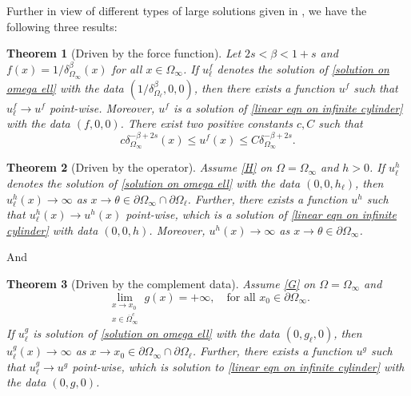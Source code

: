 \documentclass{amsart}
\newtheorem{theorem}{Theorem}[section]
\newcommand{\ul}{u_{\ell}}
\begin{document}
Further in view of different types of large solutions given in \cite{Abatangelo2015LargesHarmonic}, we have the following three results:

\begin{theorem}[Driven by the force function] 
Let $2s<\beta<1+s$ and $f(x)=1/\delta^{\beta}_{\Omega_{\infty}}(x)$ for all $x\in \Omega_{\infty}$. If $u_{\ell}^{f}$ denotes the solution of \eqref{solution on omega ell} with the data $(1/\delta_{\Omega_\ell}^{\beta},0,0)$, then there exists a function $u^{f}$ such that $\ul^{f}\to u^{f}$ point-wise. Moreover, $u^{f}$ is a solution of \eqref{linear eqn on infinite cylinder} with the data $(f,0,0)$. There exist two positive constants $c, C$ such that 
      \begin{equation*}
          c\delta_{\Omega_{\infty}}^{-\beta+2s}(x)\leq u^{f}(x)\leq C \delta_{\Omega_{\infty}}^{-\beta+2s}.
      \end{equation*}
\end{theorem}
\begin{theorem}[Driven by the operator]
Assume \ref{H} on $\Omega=\Omega_{\infty}$ and $h>0$.  If $u_{\ell}^{h}$ denotes the solution of \eqref{solution on omega ell} with the data $(0,0,h_{\ell})$, then $u_{\ell}^{h}(x)\to \infty$ as $x\to \theta \in \partial\Omega_{\infty}\cap \partial\Omega_{\ell}$. Further, there exists a function $u^{h}$ such that $u_{\ell}^{h}(x)\to u^{h}(x)$ point-wise, which is a solution of \eqref{linear eqn on infinite cylinder} with data $(0,0,h)$. Moreover, $u^{h}(x)\to \infty$ as $x\to \theta\in \partial\Omega_{\infty}$.
\end{theorem}
And
\begin{theorem}[Driven by the complement data] 
Assume \ref{G} on $\Omega=\Omega_{\infty}$ and 
      \begin{equation*}
          \lim_{\substack{x \to x_{0} \\ x\in\overline{\Omega}^{c}_{\infty}}} g(x)=+\infty, \quad \text{for all } x_{0} \in \partial\Omega_{\infty}.
      \end{equation*}
      If $u^{g}_{\ell}$ is solution of \eqref{solution on omega ell} with the data $(0,g_\ell,0)$, then $u_{\ell}^{g}(x)\to \infty$ as $x\to x_{0}\in \partial\Omega_{\infty}\cap \partial\Omega_{\ell}$. Further,  there exists a function $u^{g}$ such that $u_{\ell}^{g}\to u^{g}$ point-wise, which is solution to \eqref{linear eqn on infinite cylinder} with the data $(0,g,0)$.
\end{theorem}
\end{document}
